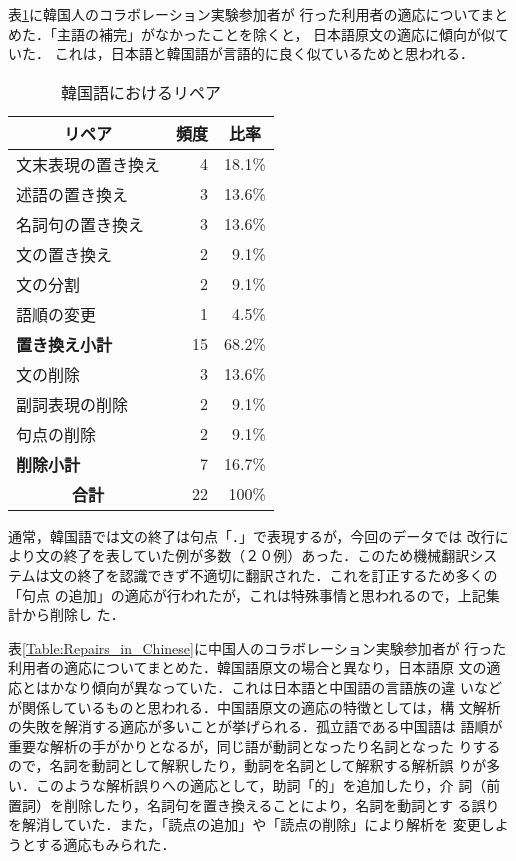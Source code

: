 表\ref{Table:Repairs_in_Korean}に韓国人のコラボレーション実験参加者が
行った利用者の適応についてまとめた．「主語の補完」がなかったことを除くと，
日本語原文の適応に傾向が似ていた．
これは，日本語と韓国語が言語的に良く似ているためと思われる．

\begin{table}[htbp]
    \leavevmode
\small
    \caption{韓国語におけるリペア}
    \label{Table:Repairs_in_Korean}
    \vspace*{-3mm}
\begin {center}
\begin{tabular}{|l|r|r|}
\hline
\multicolumn{1}{|c|}{\bf リペア} & 
\multicolumn{1}{c|}{\bf 頻度} & 
\multicolumn{1}{c|}{\bf 比率} \\
\hline 
文末表現の置き換え &  4 & 18.1\% \\
述語の置き換え     &  3 & 13.6\% \\
名詞句の置き換え   &  3 & 13.6\% \\
\hline 
文の置き換え       &  2 &  9.1\% \\
文の分割           &  2 &  9.1\% \\
語順の変更         &  1 &  4.5\% \\
\hline 
{\bf 置き換え小計} & 15 & 68.2\% \\
\hline \hline 
文の削除           &  3 & 13.6\% \\
副詞表現の削除     &  2 &  9.1\% \\
句点の削除         &  2 &  9.1\% \\
\hline 
{\bf 削除小計}     &  7 & 16.7\% \\
\hline \hline
\multicolumn{1}{|c|}{\bf 合計} & 22 & 100\% \\
\hline
\end{tabular}
\end{center}
   \footnotesize 
{通常，韓国語では文の終了は句点「．」で表現するが，今回のデータでは
改行により文の終了を表していた例が多数（２０例）あった．このため機械翻訳シス
テムは文の終了を認識できず不適切に翻訳された．これを訂正するため多くの「句点
の追加」の適応が行われたが，これは特殊事情と思われるので，上記集計から削除し
た．}
\end{table}

表\ref{Table:Repairs_in_Chinese}に中国人のコラボレーション実験参加者が
行った利用者の適応についてまとめた．韓国語原文の場合と異なり，日本語原
文の適応とはかなり傾向が異なっていた．これは日本語と中国語の言語族の違
いなどが関係しているものと思われる．中国語原文の適応の特徴としては，構
文解析の失敗を解消する適応が多いことが挙げられる．孤立語である中国語は
語順が重要な解析の手がかりとなるが，同じ語が動詞となったり名詞となった
りするので，名詞を動詞として解釈したり，動詞を名詞として解釈する解析誤
りが多い．このような解析誤りへの適応として，助詞「的」を追加したり，介
詞（前置詞）を削除したり，名詞句を置き換えることにより，名詞を動詞とす
る誤りを解消していた．また，「読点の追加」や「読点の削除」により解析を
変更しようとする適応もみられた．


